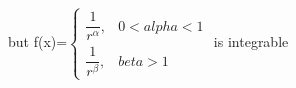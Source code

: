 \documentclass[preview]{standalone}
\begin{document}
\begin{center}
but f(x)=$\begin{cases} \dfrac{1}{r^\alpha} , & 0< alpha <1 \\  \dfrac{1}{r^\beta} , & beta > 1 \end{cases}$ is integrable
\end{center}
\end{document}
